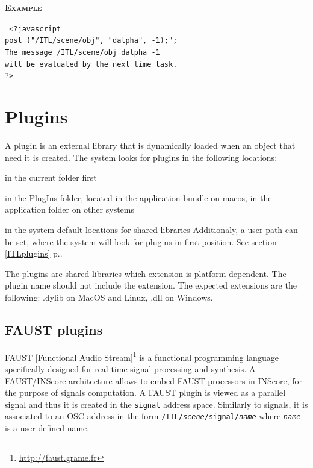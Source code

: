 \documentclass[a4paper,twoside]{report}
\newcommand{\toplevel}[1]	{\chapter{#1}}
\newcommand{\sublevel}[1]	{\section{#1}}
\newcommand{\fullref}[1]	{\ref{#1} p.\pageref{#1}}
\newcommand{\OSC}[1]		{\texttt{#1}}
\newcommand{\example}		{\textbf{\hspace{-1.5cm}\textbf{\textsc{Example }}}}
\newcommand{\note}	[1]		{\vspace{2mm}\textbf{\hspace{-1.03cm}\textbf{\textsc{Note #1}}}}
\let\olditemize\itemize
\let\oldenditemize\enditemize
\renewenvironment{itemize} 	{\olditemize \setlength{\itemsep}{1mm}}{\oldenditemize}
\newcommand{\sample}	[1]			{\vspace{-2mm}\begin{center}\colorbox{mygrey}{
								\begin{minipage}[t]{0.9\columnwidth} 
								{\small \texttt{#1}}
								\end{minipage}}\end{center}}
\begin{document}
\example
\sample{
<?javascript \\
\hspace*{3mm} post ("/ITL/scene/obj", "dalpha", -1);";\\ 
\hspace*{3mm} The message /ITL/scene/obj dalpha -1 \\
\hspace*{3mm} will be evaluated by the next time task. \\
?>
}


%


\toplevel{Plugins}
\label{plugins}

A plugin is an external library that is dynamically loaded when an object that need it is created.
The system looks for plugins in the following locations:
\begin{itemize}
\item in the current folder first
\item in the PlugIns folder, located in the application bundle on macos, in the application folder on other systems
\item in the system default locations for shared libraries
\end{itemize}
Additionaly, a user path can be set, where the system will look for plugins in first position. See section \fullref{ITLplugins}.

The plugins are shared libraries which extension is platform dependent. The plugin name should not include the extension. The expected extensions are the following: .dylib on MacOS and Linux, .dll on Windows.



\sublevel{FAUST plugins}
\label{faust}

FAUST [Functional Audio Stream]\footnote{\url{http://faust.grame.fr}} is a functional programming language specifically designed for real-time signal processing and synthesis. A FAUST/INScore architecture allows to embed FAUST processors in INScore, for the purpose of signals computation. A FAUST plugin is viewed as a parallel signal and thus it is created in the \OSC{signal} address space. Similarly to signals, it is associated to an OSC address in the form \OSC{/ITL/\emph{scene}/signal/\emph{name}} where \OSC{\emph{name}} is a user defined name.
\end{document}
